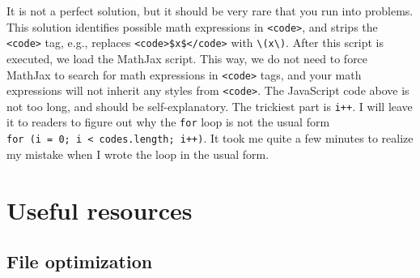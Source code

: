 \documentclass[12pt,]{krantz}
\makeatletter
\newenvironment{Shaded}{\begin{snugshade}}{\end{snugshade}}
\newcommand{\SpecialCharTok}[1]{\textcolor[rgb]{0.00,0.00,0.00}{#1}}
\newcommand{\SpecialStringTok}[1]{\textcolor[rgb]{0.31,0.60,0.02}{#1}}
\newcommand{\CommentTok}[1]{\textcolor[rgb]{0.56,0.35,0.01}{\textit{#1}}}
\newcommand{\VariableTok}[1]{\textcolor[rgb]{0.00,0.00,0.00}{#1}}
\newcommand{\ControlFlowTok}[1]{\textcolor[rgb]{0.13,0.29,0.53}{\textbf{#1}}}
\newcommand{\OperatorTok}[1]{\textcolor[rgb]{0.81,0.36,0.00}{\textbf{#1}}}
\newcommand{\AttributeTok}[1]{\textcolor[rgb]{0.77,0.63,0.00}{#1}}
\newcommand{\NormalTok}[1]{#1}
\newenvironment{kframe}{%
\medskip{}
\setlength{\fboxsep}{.8em}
 \def\at@end@of@kframe{}%
 \ifinner\ifhmode%
  \def\at@end@of@kframe{\end{minipage}}%
  \begin{minipage}{\columnwidth}%
 \fi\fi%
 \def\FrameCommand##1{\hskip\@totalleftmargin \hskip-\fboxsep
 \colorbox{shadecolor}{##1}\hskip-\fboxsep
     \hskip-\linewidth \hskip-\@totalleftmargin \hskip\columnwidth}%
 \MakeFramed {\advance\hsize-\width
   \@totalleftmargin\z@ \linewidth\hsize
   \@setminipage}}%
 {\par\unskip\endMakeFramed%
 \at@end@of@kframe}
\renewenvironment{Shaded}{\begin{kframe}}{\end{kframe}}
\theoremstyle{definition}
\theoremstyle{definition}
\theoremstyle{definition}
\theoremstyle{remark}
\makeatother
\begin{document}
\begin{Shaded}
\end{Shaded}

It is not a perfect solution, but it should be very rare that you run
into problems. This solution identifies possible math expressions in
\texttt{\textless{}code\textgreater{}}, and strips the
\texttt{\textless{}code\textgreater{}} tag, e.g., replaces
\texttt{\textless{}code\textgreater{}\$x\$\textless{}/code\textgreater{}}
with \texttt{\textbackslash{}(x\textbackslash{})}. After this script is
executed, we load the MathJax script. This way, we do not need to force
MathJax to search for math expressions in
\texttt{\textless{}code\textgreater{}} tags, and your math expressions
will not inherit any styles from \texttt{\textless{}code\textgreater{}}.
The JavaScript code above is not too long, and should be
self-explanatory. The trickiest part is \texttt{i++}. I will leave it to
readers to figure out why the \texttt{for} loop is not the usual form
\texttt{for\ (i\ =\ 0;\ i\ \textless{}\ codes.length;\ i++)}. It took me
quite a few minutes to realize my mistake when I wrote the loop in the
usual form.

\section{Useful resources}\label{useful-resources}

\subsection{File optimization}\label{file-optimization}
\end{document}
